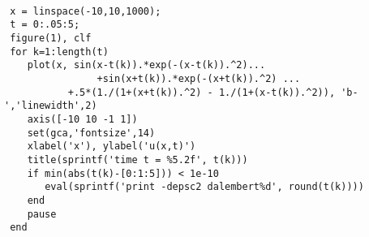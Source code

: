 {\footnotesize\begin{verbatim}

 x = linspace(-10,10,1000);
 t = 0:.05:5;
 figure(1), clf
 for k=1:length(t)
    plot(x, sin(x-t(k)).*exp(-(x-t(k)).^2)...
                +sin(x+t(k)).*exp(-(x+t(k)).^2) ...
           +.5*(1./(1+(x+t(k)).^2) - 1./(1+(x-t(k)).^2)), 'b-','linewidth',2)
    axis([-10 10 -1 1])
    set(gca,'fontsize',14)
    xlabel('x'), ylabel('u(x,t)')
    title(sprintf('time t = %5.2f', t(k)))
    if min(abs(t(k)-[0:1:5])) < 1e-10
       eval(sprintf('print -depsc2 dalembert%d', round(t(k))))
    end
    pause
 end
\end{verbatim}}

